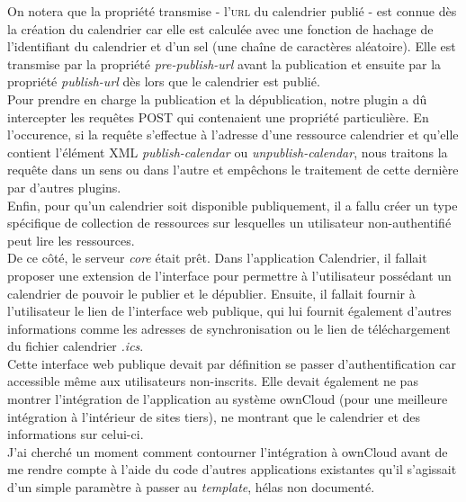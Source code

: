 \documentclass[10pt,a4paper, twoside]{report}
\begin{document}
	On notera que la propriété transmise - l'\textsc{url} du calendrier publié - est connue dès la création du calendrier car elle est calculée avec une fonction de hachage de l'identifiant du calendrier et d'un sel (une chaîne de caractères aléatoire).
	Elle est transmise par la propriété \textit{pre-publish-url} avant la publication et ensuite par la propriété \textit{publish-url} dès lors que le calendrier est publié.
	\\
	
	Pour prendre en charge la publication et la dépublication, notre plugin a dû intercepter les requêtes POST qui contenaient une propriété particulière.
	En l'occurence, si la requête s'effectue à l'adresse d'une ressource calendrier et qu'elle contient l'élément XML \textit{publish-calendar} ou \textit{unpublish-calendar}, nous traitons la requête dans un sens ou dans l'autre et empêchons le traitement de cette dernière par d'autres plugins.
	\\
	
	Enfin, pour qu'un calendrier soit disponible publiquement, il a fallu créer un type spécifique de collection de ressources sur lesquelles un utilisateur non-authentifié peut lire les ressources.
	\\
	
	De ce côté, le serveur \textit{core} était prêt. Dans l'application Calendrier, il fallait proposer une extension de l'interface pour permettre à l'utilisateur possédant un calendrier de pouvoir le publier et le dépublier. Ensuite, il fallait fournir à l'utilisateur le lien de l'interface web publique, qui lui fournit également d'autres informations comme les adresses de synchronisation ou le lien de téléchargement du fichier calendrier \textit{.ics}.
	\\
	
	Cette interface web publique devait par définition se passer d'authentification car accessible même aux utilisateurs non-inscrits.
	Elle devait également ne pas montrer l'intégration de l'application au système ownCloud (pour une meilleure intégration à l'intérieur de sites tiers), ne montrant que le calendrier et des informations sur celui-ci.
	\\
	
	J'ai cherché un moment comment contourner l'intégration à ownCloud avant de me rendre compte à l'aide du code d'autres applications existantes qu'il s'agissait d'un simple paramètre à passer au \textit{template}, hélas non documenté.
	\\
	
\end{document}
